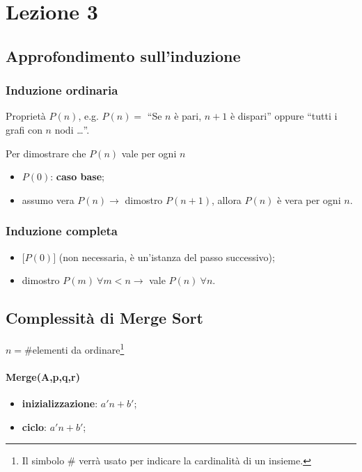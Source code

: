 \section{Lezione 3}

\subsection{Approfondimento sull'induzione}

\subsubsection{Induzione ordinaria} 

Proprietà $P(n)$, e.g.  $P(n) = $ ``Se $n$ è pari, $n+1$ è dispari'' oppure 
``tutti i grafi con $n$ nodi \dots ''.\par
Per dimostrare che $P(n)$ vale per ogni $n$
\begin{itemize}
	\item $P(0)$: \textbf{caso base};
	\item assumo vera $P(n) \rightarrow $ dimostro $P(n+1)$, allora $P(n)$
	è vera per ogni $n$.
\end{itemize}

\subsubsection{Induzione completa}
\begin{itemize}
	\item $\big[ P(0) \big]$ (non necessaria, è un'istanza del passo successivo);
	\item dimostro $P(m) \ \forall m<n \rightarrow $ vale $P(n) \ \forall n$.  
\end{itemize}

\subsection{Complessità di Merge Sort}

$n = \#$elementi da ordinare\footnote{Il simbolo \# verrà usato per indicare la cardinalità di un insieme.}

\paragraph{Merge(A,p,q,r)}
\begin{itemize}
	\item[] \textbf{inizializzazione}: $a'n+b'$;
	\item[] \textbf{ciclo}: $a'n+b'$;
\end{itemize}


